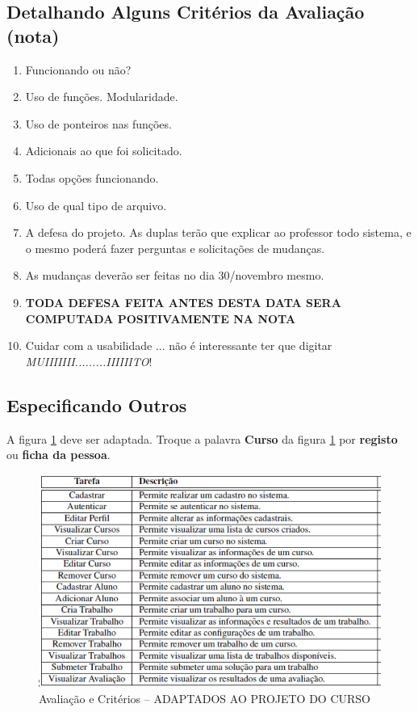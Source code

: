 \documentclass[12pt,a4paper]{article}
\begin{document}
\subsection{Detalhando Alguns Critérios da Avaliação (nota)}


\begin{enumerate}
  \item Funcionando ou não?
  \item Uso de funções. Modularidade.
    \item Uso de ponteiros nas funções.
    \item Adicionais ao que foi solicitado.
    \item Todas opções funcionando.
    \item Uso de qual tipo de arquivo.
     \item A defesa do projeto. As duplas terão que explicar ao professor
     todo sistema, e o mesmo poderá fazer perguntas e solicitações de mudanças.
     \item As mudanças deverão ser feitas no dia 30/novembro mesmo.
     \item \textbf{TODA DEFESA FEITA ANTES DESTA DATA SERA COMPUTADA POSITIVAMENTE NA NOTA}
     \item Cuidar com a usabilidade ... não é interessante ter que digitar \textit{MUIIIIIII.........IIIIIITO}!
     
    
\end{enumerate}


\subsection{Especificando Outros}

A figura \ref{fig_aval_02} deve ser adaptada. Troque a palavra \textbf{Curso} da 
figura \ref{fig_aval_02} por \textbf{registo }ou \textbf{ficha da pessoa}.

 \begin{figure}[!hb]
   \begin{center}
     \includegraphics[scale=0.55]{fig_avaliacao_pgms_02.jpg}
   
     \caption{Avaliação e Critérios -- ADAPTADOS AO PROJETO DO CURSO}
       \label{fig_aval_02} %
   \end{center}
 \end{figure}
 
\end{document}

